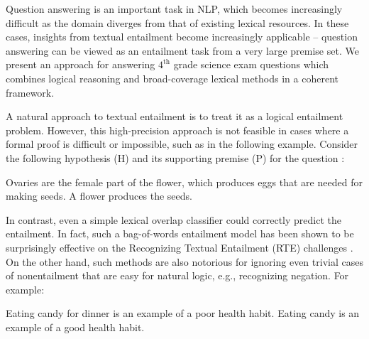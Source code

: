 Question answering is an important task in NLP, which becomes
increasingly difficult as the domain diverges from that of existing lexical resources.
In these cases, insights from textual entailment become increasingly applicable --
  question answering can be viewed as an entailment task from a
  very large premise set.
We present an approach for answering $4^\textrm{th}$ grade science exam questions
  which combines logical reasoning and broad-coverage lexical methods in a
  coherent framework.

A natural approach to textual entailment
  is to treat it as a logical entailment problem.
However, this high-precision approach is not feasible in cases
    where a formal proof is difficult or impossible, such as
    in the following example.
Consider the following hypothesis (H) 
  and its supporting premise (P)
  for the question :

\entailmentExample
{Ovaries are the female part of the flower, which produces eggs that are needed for making seeds.}
{A flower produces the seeds.}

In contrast, even a simple lexical overlap classifier could correctly predict
  the entailment.
In fact, such a bag-of-words entailment model has been shown to be surprisingly
  effective on the Recognizing Textual Entailment (RTE) challenges 
  \cite{key:2009maccartney-thesis}.
On the other hand, such methods are also notorious for ignoring even trivial 
  cases of nonentailment that are easy for natural logic, e.g., recognizing negation.
For example:

\entailmentExample
{Eating candy for dinner is an example of a poor health habit.}
{Eating candy is an example of a good health habit.}

